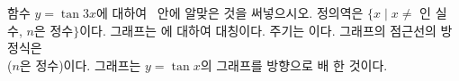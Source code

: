 함수 $y=\tan 3x$에 대하여 \blank\ 안에 알맞은 것을 써넣으시오.
 정의역은 $\{x \mid x\ne$ \blank[4.5em] 인 실수, $n$은 정수$\}$이다.
 그래프는 \blank[3em]에 대하여 대칭이다.
 주기는 \blank[2em]이다.
 그래프의 점근선의 방정식은\\ \blank[5em] ($n$은 정수)이다.
 그래프는 $y=\tan x$의 그래프를  방향으로 \blank[2em]배 한 것이다.
